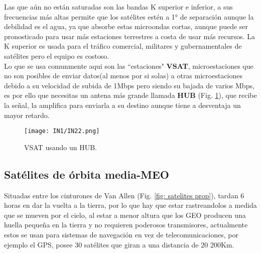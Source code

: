 \documentclass[
	12pt, %
	fleqn, %
	a4paper, %
]{LegrandOrangeBook}
\begin{document}
Las que aún no están saturadas son las bandas K superior e inferior, a sus frecuencias más altas permite que los satélites estén a 1° de separación aunque la debilidad es el agua, ya que absorbe estas microondas cortas, aunque puede ser pronosticado para usar más estaciones terrestres a costa de usar más recursos. La K superior es usada para el tráfico comercial, militares y gubernamentales de satélites pero el equipo es costoso.\\
Lo que se usa comunmente aqui son las ``estaciones" \textbf{VSAT}, microestaciones que no son posibles de enviar datos(al menos por si solas) a otras microestaciones debido a su velocidad de subida de 1Mbps pero siendo su bajada de varios Mbps, es por ello que necesitas un antena más grande llamada \textbf{HUB} (Fig. \ref{fig: vsat hub}), que recibe la señal, la amplifica para enviarla a su destino aunque tiene a desventaja un mayor retardo.
\begin{figure}[H]
\centering
\texttt{[image: IN1/IN22.png]}
\caption{VSAT usando un HUB.}
\label{fig: vsat hub}
\end{figure}
\subsection{Satélites de órbita media-MEO}
Situadas entre los cinturones de Van Allen (Fig. \ref{fig: satelites prop}), tardan 6 horas en dar la vuelta a la tierra, por lo que hay que estar rastreandolos a medida que se mueven por el cielo, al estar a menor altura que los GEO producen una huella pequeña en la tierra y no requieren poderosos transmisores, actualmente estos se usan para sistemas de navegación en vez de telecomunicaciones, por ejemplo el GPS, posee 30 satélites que giran a una distancia de 20 200Km.
\end{document}
